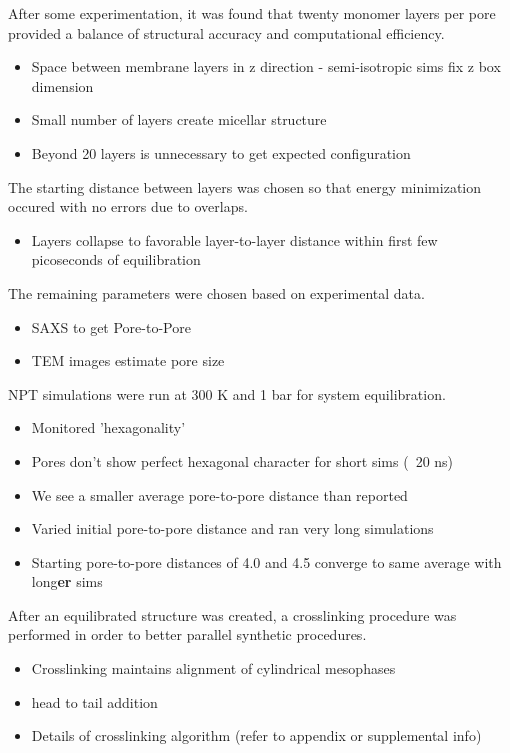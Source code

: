 \documentclass{article}
\begin{document}
After some experimentation, it was found that twenty monomer layers per pore provided a balance of structural accuracy and computational efficiency. 
\begin{itemize}
	\item Space between membrane layers in z direction - semi-isotropic sims fix z box dimension
	\item Small number of layers create micellar structure
	\item Beyond 20 layers is unnecessary to get expected configuration
\end{itemize}

The starting distance between layers was chosen so that energy minimization occured with no errors due to overlaps. 
\begin{itemize}
	\item Layers collapse to favorable layer-to-layer distance within first few picoseconds of equilibration 
\end{itemize}

\noindent The remaining parameters were chosen based on experimental data. 
\begin{itemize}
	\item SAXS to get Pore-to-Pore
	\item TEM images estimate pore size
\end{itemize}

\noindent NPT simulations were run at 300 K and 1 bar for system equilibration. 
\begin{itemize}
	\item Monitored 'hexagonality'
	\item Pores don't show perfect hexagonal character for short sims (~20 ns) 
	\item We see a smaller average pore-to-pore distance than reported
	\item Varied initial pore-to-pore distance and ran very long simulations
	\item Starting pore-to-pore distances of 4.0 and 4.5 converge to same average with long\textbf{er} sims 
\end{itemize}

After an equilibrated structure was created, a crosslinking procedure was performed in order to better parallel synthetic procedures. 
\begin{itemize}
	\item Crosslinking maintains alignment of cylindrical mesophases
	\item head to tail addition
	\item Details of crosslinking algorithm (refer to appendix or supplemental info)
\end{itemize}
\end{document}
